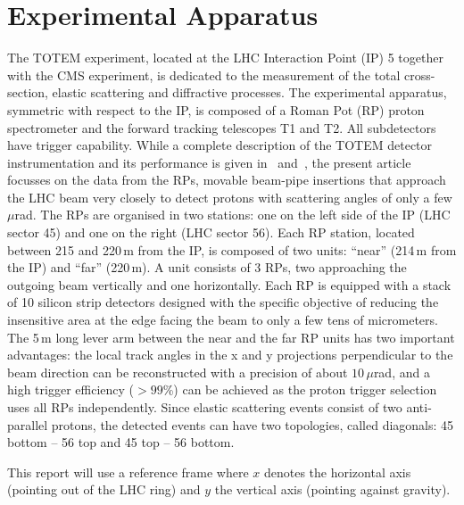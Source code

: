 \section{Experimental Apparatus}
%
The TOTEM experiment, located at the LHC Interaction Point (IP) 5 together with
the CMS experiment, is dedicated to the measurement of the total 
cross-section, elastic scattering
and diffractive processes. The experimental
apparatus, symmetric with respect to the IP, is 
composed of a Roman Pot (RP) proton spectrometer and the forward tracking 
telescopes T1 and T2. All subdetectors have trigger capability. 
While a complete description of the TOTEM detector instrumentation 
and its performance is given in~\cite{totem-jinst} and~\cite{totem-ijmp}, 
the present article focusses on the data from the RPs, movable beam-pipe
insertions that approach the LHC beam very closely to detect protons with
scattering angles of only a few $\mu$rad. 
The RPs are organised in two stations: one on the left side of the IP 
(LHC sector 45) and one on the right (LHC sector 56).
Each RP station, located between 215 and 220\,m from the IP, is composed of two 
units: ``near'' (214\,m from the IP) and ``far'' (220\,m). 
A unit consists of 3 RPs, two
approaching the outgoing beam vertically and one horizontally.
Each RP is equipped with a stack of 10 silicon
strip detectors designed with the specific objective of
reducing the insensitive area at the edge facing the beam
to only a few tens of micrometers. The 5\,m long lever arm 
between the near and the far RP units has two important
advantages: the local track angles in the x and y projections
perpendicular to the beam direction can be reconstructed
with a precision of about $10\,\mu$rad, and a high trigger efficiency
($> 99$\%) can be achieved as the proton trigger selection
uses all RPs independently. Since elastic scattering events consist of two anti-parallel protons, the detected events can have two topologies, called diagonals: 45 bottom -- 56 top and 45 top -- 56 bottom.

This report will use a reference frame where $x$ denotes the horizontal axis (pointing out of the LHC ring) and $y$ the vertical axis (pointing against gravity).

